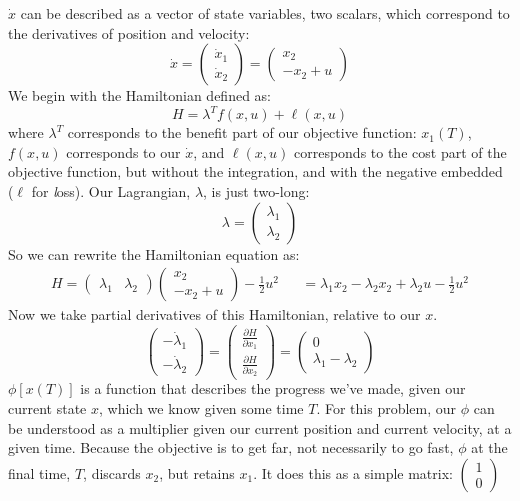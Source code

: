 \documentclass[11pt]{report}
\begin{document}
$\dot{x}$ can be described as a vector of state variables, two scalars, which correspond to the derivatives of position and velocity:
\[
  \dot{x} =
  \begin{pmatrix}
    \dot{x}_1\\
    \dot{x}_2
  \end{pmatrix}
  =
  \begin{pmatrix}
    x_2\\
    -x_2 + u
  \end{pmatrix}
\]
We begin with the Hamiltonian defined as:
\[ H = \lambda^Tf(x, u) + \ell(x, u) \]
where $\lambda^T$ corresponds to the benefit part of our objective function: $x_1(T)$, $f(x, u)$ corresponds to our $\dot{x}$, and $\ell(x, u)$ corresponds to the cost part of the objective function, but without the integration, and with the negative embedded ($\ell$ for \emph{l}oss).
Our Lagrangian, $\lambda$, is just two-long:
\[ \lambda =
  \begin{pmatrix}
    \lambda_1\\
    \lambda_2
  \end{pmatrix}
\]
So we can rewrite the Hamiltonian equation as:
\begin{align*}
  H =
  \begin{pmatrix}
    \lambda_1 &
    \lambda_2
  \end{pmatrix}
  \begin{pmatrix}
    x_2 \\
    -x_2 + u
  \end{pmatrix}
  -
  \frac{1}{2}u^2
  & &
  =
  \lambda_1x_2 - \lambda_2x_2 + \lambda_2u - \frac{1}{2}u^2
\end{align*}
Now we take partial derivatives of this Hamiltonian, relative to our $x$.
\[
  \begin{pmatrix}
    -\dot\lambda_1 \\
    -\dot\lambda_2
  \end{pmatrix}
  =
  \begin{pmatrix}
    \frac{\partial H}{\partial x_1} \\
    \frac{\partial H}{\partial x_2}
  \end{pmatrix}
  =
  \begin{pmatrix}
    0 \\
    \lambda_1 - \lambda_2
  \end{pmatrix}
\]
$\phi[x(T)]$ is a function that describes the progress we've made, given our current state $x$, which we know given some time $T$.
For this problem, our $\phi$ can be understood as a multiplier given our current position and current velocity, at a given time. Because the objective is to get far, not necessarily to go fast, $\phi$ at the final time, $T$, discards $x_2$, but retains $x_1$. It does this as a simple matrix: \(\begin{pmatrix} 1 \\ 0 \end{pmatrix}\)
\end{document}
